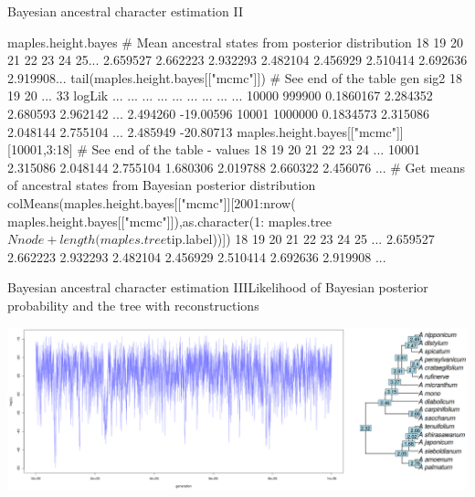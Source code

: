 \documentclass[compress, ucs, xelatex, 11pt, xcolor=svgnames, aspectratio=169,
	hyperref={
		bookmarks=true,
		unicode=true,
		colorlinks=true,
		pdftitle={Molecular data in R},
		plainpages=false,
		pdfauthor={Vojtech Zeisek},
		pdfsubject={Course about phylogeny and evolution in R},
		pdfcreator={XeLaTeX},
		pdfkeywords={R, evolution, phylogeny, molecular data},
		linkcolor=Crimson, %
		anchorcolor=Magenta, %
		citecolor=Magenta, %
		filecolor=Magenta, %
		menucolor=Magenta, %
		urlcolor=DodgerBlue, %
		pdftex},
	url={hyphens, lowtilde} %
	]{beamer}
\begin{document}
\begin{frame}[fragile]{Bayesian ancestral character estimation II}
	\begin{spluscode}
    maples.height.bayes # Mean ancestral states from posterior distribution
          18       19       20       21       22       23       24       25...
    2.659527 2.662223 2.932293 2.482104 2.456929 2.510414 2.692636 2.919908...
    tail(maples.height.bayes[["mcmc"]]) # See end of the table
              gen      sig2       18       19       20 ...       33    logLik
       ...     ...       ...      ...      ...      ... ...      ...       ...
    10000  999900 0.1860167 2.284352 2.680593 2.962142 ... 2.494260 -19.00596
    10001 1000000 0.1834573 2.315086 2.048144 2.755104 ... 2.485949 -20.80713
    maples.height.bayes[["mcmc"]][10001,3:18] # See end of the table - values
                18       19       20       21       22       23       24 ...
    10001 2.315086 2.048144 2.755104 1.680306 2.019788 2.660322 2.456076 ...
    # Get means of ancestral states from Bayesian posterior distribution
    colMeans(maples.height.bayes[["mcmc"]][2001:nrow(
      maples.height.bayes[["mcmc"]]),as.character(1:
      maples.tree$Nnode+length(maples.tree$tip.label))])
          18       19       20       21       22       23       24       25 ...
    2.659527 2.662223 2.932293 2.482104 2.456929 2.510414 2.692636 2.919908 ...
	\end{spluscode}
\end{frame}

\begin{frame}{Bayesian ancestral character estimation III}{Likelihood of Bayesian posterior probability and the tree with reconstructions}
	\begin{center}
		\includegraphics[width=\textwidth]{ancbayes.png}
	\end{center}
\end{frame}
\end{document}
